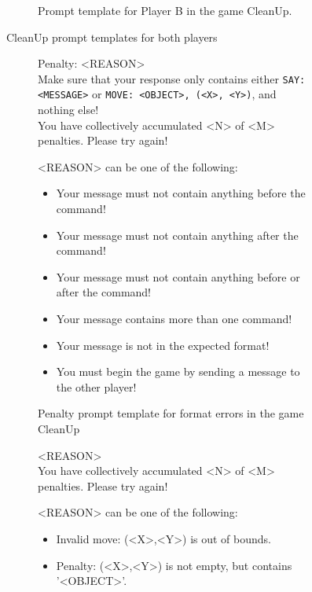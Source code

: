 \documentclass[../main.tex]{subfiles}
\begin{document}
\begin{figure}
\begin{subfigure}[b]{0.48\textwidth}
\caption{Prompt template for Player B in the game CleanUp.}
\label{fig:clean_up_player_b}
\end{subfigure}
\caption{CleanUp prompt templates for both players} \label{fig:clean_up_prompt_templates}
\end{figure}

\begin{figure}
  \centering
  \begin{subfigure}[b]{1\textwidth}
      \begin{prompt}
        Penalty: <REASON> \\
        Make sure that your response only contains either \verb|SAY: <MESSAGE>| or \verb|MOVE: <OBJECT>, (<X>, <Y>)|, and nothing else! \\
        You have collectively accumulated <N> of <M> penalties. Please try again!
      \end{prompt}
      \small
      <REASON> can be one of the following:
        \begin{itemize}
          \item Your message must not contain anything before the command!
          \item Your message must not contain anything after the command!
          \item Your message must not contain anything before or after the command!
          \item Your message contains more than one command!
          \item Your message is not in the expected format!
          \item You must begin the game by sending a message to the other player!
        \end{itemize}
    \caption{Penalty prompt template for format errors in the game CleanUp}
    \label{fig:clean_up_format_error}
  \end{subfigure}
  \begin{subfigure}[b]{1\textwidth}
    \begin{prompt}
        <REASON> \\
        You have collectively accumulated <N> of <M> penalties. Please try again!
    \end{prompt}
    \small <REASON> can be one of the following:
      \begin{itemize}
          \item Invalid move: (<X>,<Y>) is out of bounds.
          \item Penalty: (<X>,<Y>) is not empty, but contains '<OBJECT>'.

\end{itemize}
\end{subfigure}
\end{figure}
\end{document}

